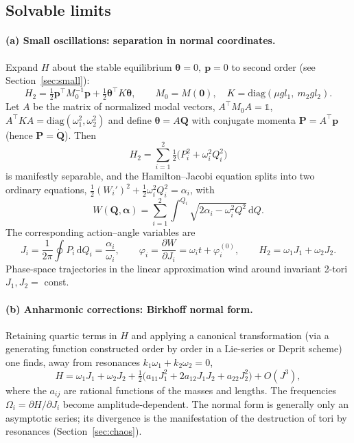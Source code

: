 \documentclass[11pt,a4paper]{book}
\theoremstyle{definition}
\theoremstyle{remark}
\newcommand{\dd}{\mathrm{d}}
\begin{document}
\subsection{Solvable limits}

\paragraph{(a) Small oscillations: separation in normal coordinates.}
Expand $H$ about the stable equilibrium $\bm\theta=0,\ \bm p=0$ to second order (see Section~\ref{sec:small}):
\begin{equation}
  H_2=\tfrac12\bm p^\top M_0^{-1}\bm p+\tfrac12\bm\theta^\top K\bm\theta,
  \qquad M_0=M(\bm0),\quad K=\mathrm{diag}(\mu g l_1,\ m_2g l_2).
\end{equation}
Let $A$ be the matrix of normalized modal vectors, $A^\top M_0A=\mathbb 1$, $A^\top KA=\mathrm{diag}(\omega_1^2,\omega_2^2)$
and define $\bm\theta=A\bm Q$ with conjugate momenta $\bm P=A^{\top}\bm p$ (hence $\bm P=\dot{\bm Q}$). Then
\begin{equation}
  H_2=\sum_{i=1}^{2}\tfrac12\big(P_i^2+\omega_i^2Q_i^2\big)
\end{equation}
is manifestly separable, and the Hamilton--Jacobi equation splits into two ordinary equations,
$\tfrac12(W_i')^2+\tfrac12\omega_i^2Q_i^2=\alpha_i$, with
\begin{equation}
  W(\bm Q,\bm\alpha)=\sum_{i=1}^{2}\int^{Q_i}\!\sqrt{2\alpha_i-\omega_i^2Q^2}\,\dd Q .
\end{equation}
The corresponding action--angle variables are
\begin{equation}
  J_i=\frac1{2\pi}\oint P_i\,\dd Q_i=\frac{\alpha_i}{\omega_i},\qquad
  \varphi_i=\frac{\partial W}{\partial J_i}=\omega_it+\varphi_i^{(0)},\qquad
  H_2=\omega_1J_1+\omega_2J_2 .
  \label{eq:AA}
\end{equation}
Phase-space trajectories in the linear approximation wind around invariant 2-tori $J_1,J_2=$ const.

\paragraph{(b) Anharmonic corrections: Birkhoff normal form.}
Retaining quartic terms in $H$ and applying a canonical transformation (via a generating function constructed order
by order in a Lie-series or Deprit scheme) one finds, away from resonances $k_1\omega_1+k_2\omega_2=0$,
\begin{equation}
  H=\omega_1J_1+\omega_2J_2+\tfrac12\big(a_{11}J_1^2+2a_{12}J_1J_2+a_{22}J_2^2\big)+O(J^3),
\end{equation}
where the $a_{ij}$ are rational functions of the masses and lengths. The frequencies $\Omega_i=\partial H/\partial J_i$
become amplitude-dependent. The normal form is generally only an asymptotic series; its divergence is the manifestation
of the destruction of tori by resonances (Section~\ref{sec:chaos}).
\end{document}
